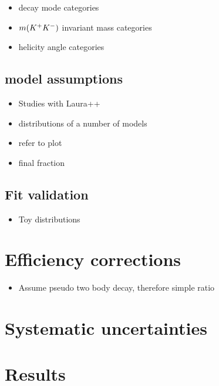 \begin{itemize}
\item \Dsp decay mode categories
\item $m({{K}^+}{{K}^-})$ invariant mass categories 
\item helicity angle categories 
\end{itemize}

\subsection{\decay{\Bp}{\Dsp \Kp \Km} model assumptions}
\label{sec:B2DsPhi_B2DsKKModel}

{\color{Red}
\begin{itemize}
\item Studies with Laura++
\item distributions of a number of models
\item refer to \Dsp\Kp\Km plot
\item final fraction
\end{itemize}
}

\subsection{Fit validation}
\label{sec:B2DsPhi_fitstrategy}

{\color{Red}
\begin{itemize}
\item Toy distributions
\end{itemize}
}

\section{Efficiency corrections}
\label{sec:B2DsPhi_effcorrections}


{\color{Red}
\begin{itemize}
\item Assume pseudo two body decay, therefore simple ratio  
\end{itemize}
}

\section{Systematic uncertainties}
\label{sec:B2DsPhi_systuncertainy}



\section{Results}
\label{sec:B2DsPhi_results}

